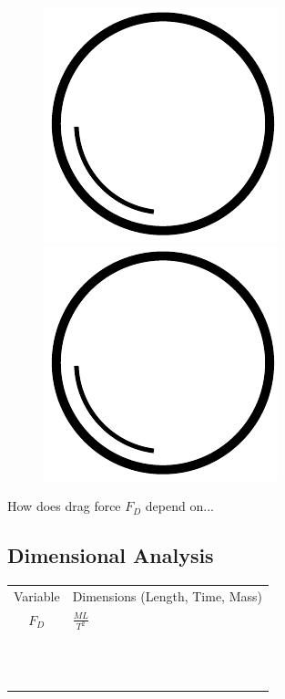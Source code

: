 \documentclass[paper=a4, fontsize=12pt]{scrartcl} %
\numberwithin{equation}{section} %
\numberwithin{figure}{section} %
\numberwithin{table}{section} %
\begin{document}
\begin{figure}[ht]
\centering
\begin{minipage}[b]{0.45\linewidth}
\includegraphics[scale=0.8]{sphere.pdf}
\end{minipage}
\quad
\begin{minipage}[b]{0.45\linewidth}
\includegraphics[scale=0.8]{sphere.pdf}
\end{minipage}
\end{figure}

How does drag force $F_D$ depend on...


\subsection*{Dimensional Analysis}
\begin{tabular}{ c || l  }
  Variable & Dimensions (Length, Time, Mass) \\
  $F_D$  & $\frac{ML}{T^2}$  \\
   &   \\
   &   \\
   &   \\
   &   \\
   &   \\
   &   \\
   &   \\
   &   \\
   &   \\
   &   \\
   &   \\
   &   \\
\end{tabular}
\end{document}
